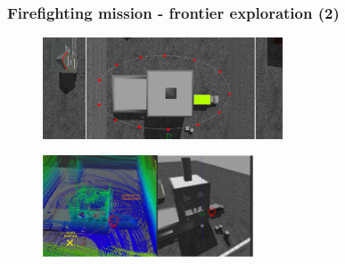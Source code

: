\begin{frame}
	\frametitle{Firefighting mission - frontier exploration (2)}
	\begin{figure}
		\includegraphics[height=3cm]{figures/building}
	\end{figure}
	\begin{figure}
	\includegraphics[height=3cm]{figures/rviz_gazebo}
	\end{figure}
		
\end{frame}

